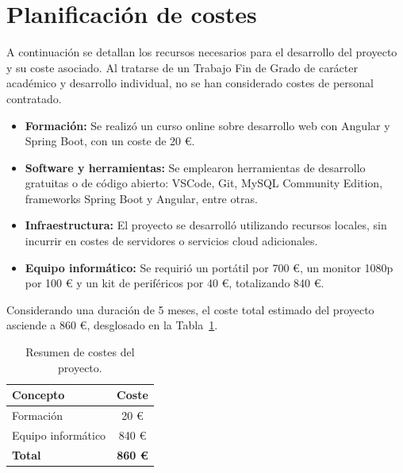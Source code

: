 \section{Planificación de costes}

A continuación se detallan los recursos necesarios para el desarrollo del proyecto y su coste asociado. Al tratarse de un Trabajo Fin de Grado de carácter académico y desarrollo individual, no se han considerado costes de personal contratado.

\begin{itemize}
    \item \textbf{Formación:} Se realizó un curso online sobre desarrollo web con Angular y Spring Boot, con un coste de 20 €.
    \item \textbf{Software y herramientas:} Se emplearon herramientas de desarrollo gratuitas o de código abierto: VSCode, Git, MySQL Community Edition, frameworks Spring Boot y Angular, entre otras.
    \item \textbf{Infraestructura:} El proyecto se desarrolló utilizando recursos locales, sin incurrir en costes de servidores o servicios cloud adicionales.
    \item \textbf{Equipo informático:} Se requirió un portátil por 700 €, un monitor 1080p por 100 € y un kit de periféricos por 40 €, totalizando 840 €.
\end{itemize}

Considerando una duración de 5 meses, el coste total estimado del proyecto asciende a 860 €, desglosado en la Tabla~\ref{tab:costes}.

\begin{table}[H]
    \centering
    \begin{tabular}{|l|c|}
    \hline
    \textbf{Concepto} & \textbf{Coste} \\ \hline
    Formación & 20 € \\ \hline
    Equipo informático & 840 € \\ \hline
    \textbf{Total} & \textbf{860 €} \\ \hline
    \end{tabular}
    \caption{Resumen de costes del proyecto.}
    \label{tab:costes}
\end{table}